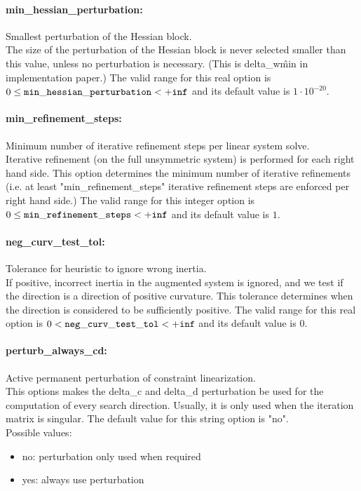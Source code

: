 \paragraph{min\_hessian\_perturbation:}\label{sec:min_hessian_perturbation} Smallest perturbation of the Hessian block. $\;$ \\
 The size of the perturbation of the Hessian block
is never selected smaller than this value, unless
no perturbation is necessary. (This is
delta\_w\^min in implementation paper.) The valid range for this real option is 
$0 \le {\tt min\_hessian\_perturbation } <  {\tt +inf}$
and its default value is $1 \cdot 10^{-20}$.


\paragraph{min\_refinement\_steps:}\label{sec:min_refinement_steps} Minimum number of iterative refinement steps per linear system solve. $\;$ \\
 Iterative refinement (on the full unsymmetric
system) is performed for each right hand side. 
This option determines the minimum number of
iterative refinements (i.e. at least
"min\_refinement\_steps" iterative refinement
steps are enforced per right hand side.) The valid range for this integer option is
$0 \le {\tt min\_refinement\_steps } <  {\tt +inf}$
and its default value is $1$.


\paragraph{neg\_curv\_test\_tol:}\label{sec:neg_curv_test_tol} Tolerance for heuristic to ignore wrong inertia. $\;$ \\
 If positive, incorrect inertia in the augmented
system is ignored, and we test if the direction
is a direction of positive curvature.  This
tolerance determines when the direction is
considered to be sufficiently positive. The valid range for this real option is 
$0 <  {\tt neg\_curv\_test\_tol } <  {\tt +inf}$
and its default value is $0$.


\paragraph{perturb\_always\_cd:}\label{sec:perturb_always_cd} Active permanent perturbation of constraint linearization. $\;$ \\
 This options makes the delta\_c and delta\_d
perturbation be used for the computation of every
search direction.  Usually, it is only used when
the iteration matrix is singular.
The default value for this string option is "no".
\\ 
Possible values:
\begin{itemize}
   \item no: perturbation only used when required
   \item yes: always use perturbation
\end{itemize}

